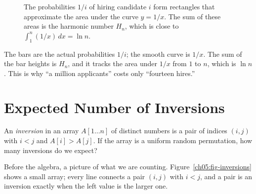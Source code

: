 \begin{figure}[htbp]
\centering
{}
\caption{The probabilities $1/i$ of hiring candidate $i$ form rectangles that approximate the area under the curve $y = 1/x$. The sum of these areas is the harmonic number $H_n$, which is close to $\int_1^n (1/x) \,dx = \ln n$.}
\label{ch05:fig-harmonic}
\end{figure}

The bars are the actual probabilities $1/i$; the smooth curve is $1/x$. The sum
of the bar heights is $H_n$, and it tracks the area under $1/x$ from $1$ to $n$,
which is $\ln n$. This is why ``a million applicants'' costs only
``fourteen hires.''

\section{Expected Number of Inversions}
\label{ch05:inversions}

An \emph{inversion} in an array $A[1\dots n]$ of distinct numbers is a pair of indices $(i,j)$ with $i < j$ and $A[i] > A[j]$. If the array is a uniform random permutation, how many inversions do we expect?

Before the algebra, a picture of what we are counting. Figure~\ref{ch05:fig-inversions}
shows a small array; every line connects a pair $(i,j)$ with $i<j$, and a pair is
an inversion exactly when the left value is the larger one.

